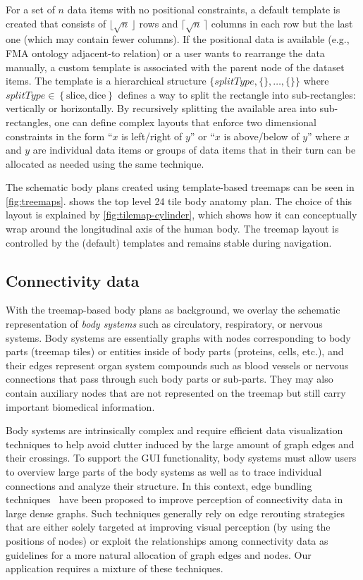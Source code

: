 For a set of $n$ data items with no positional constraints, a default template is created that consists of $\lfloor \sqrt{n}\, \rfloor$ rows and $\lceil \sqrt{n}\, \rceil$ columns in each row but the last one (which may contain fewer columns). If the positional data is available (e.g., FMA ontology adjacent-to relation) or a user wants to rearrange the data manually, a custom template is associated with the parent node of the dataset items. The template is a hierarchical structure
$\bigl\{\mathit{splitType}, \{\},\ldots, \{\}\bigr\}$ where $\mathit{splitType} \in \left\{\mathrm{slice}, \mathrm{dice}\right\}$ defines a way to split the rectangle into sub-rectangles: vertically or horizontally. By recursively splitting the available area into sub-rectangles, one can define complex layouts that enforce two dimensional constraints in the form ``$x$ is left/right of $y$'' or ``$x$ is above/below of $y$'' where $x$ and $y$ are individual data items or groups of data items that in their turn can be allocated as needed using the same technique.

The schematic body plans created using template-based treemaps can be seen in \cref{fig:treemaps}.  shows the top level 24 tile body anatomy plan. The choice of this layout is explained by \cref{fig:tilemap-cylinder}, which shows how it can conceptually wrap around the longitudinal axis of the human body. The treemap layout is controlled by the (default) templates and remains stable during navigation.


\subsection{Connectivity data} %

With the treemap-based body plans as background, we overlay the schematic representation of \emph{body systems} such as circulatory, respiratory, or nervous systems. Body systems are essentially graphs with nodes corresponding to body parts (treemap tiles) or entities inside of body parts (proteins, cells, etc.), and their edges represent organ system compounds such as blood vessels or nervous connections that pass through such body parts or sub-parts.
They may also contain auxiliary nodes that are not represented on the treemap but still carry important biomedical information.

Body systems are intrinsically complex and require efficient data visualization techniques to help avoid clutter induced by the large amount of graph edges and their crossings. To support the GUI functionality, body systems must allow users to overview large parts of the body systems as well as to trace individual connections and analyze their structure. In this context, edge bundling techniques~\cite{Hol06,GHN+11,HET12} have been proposed to improve perception of connectivity data in large dense graphs. Such techniques generally rely on edge rerouting strategies that are either solely targeted at improving visual perception (by using the positions of nodes) or exploit the relationships among connectivity data as guidelines for a more natural allocation of graph edges and nodes. Our application requires a mixture of these techniques.

